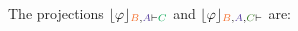 \begin{example}
\noindent
The projections $\projectionO{\varphi}{\hC{B}, \hD{A} \seq \hE{C}}$ and $\projectionO{\varphi}{\hC{B}, \hD{A}, \hF{C} \seq}$ are:
\begin{multicols}{2}{
\begin{scriptsize}
\begin{prooftree}
				 
			 
							 
\end{prooftree}
\end{scriptsize}

\begin{scriptsize}
\begin{prooftree}
					 
				 
									 
									 
\end{prooftree}
\end{scriptsize}
}
\end{multicols}
\hfill\QED
\end{example}

